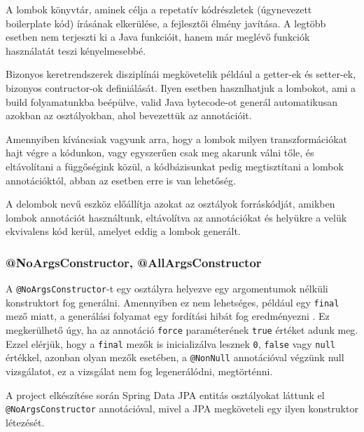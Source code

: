 A lombok könyvtár, aminek célja a repetatív kódrészletek (úgynevezett boilerplate kód) írásának elkerülése, a fejlesztői élmény javítása. A legtöbb esetben nem terjeszti ki a Java funkcióit, hanem már meglévő funkciók használatát teszi kényelmesebbé. \par

Bizonyos keretrendszerek disziplínái megkövetelik például a getter-ek és setter-ek, bizonyos contructor-ok definiálását. Ilyen esetben hasznlhatjuk a lombokot, ami a build folyamatunkba beépülve, valid Java bytecode-ot generál automatikusan azokban az osztályokban, ahol bevezettük az annotációit.\par

Amennyiben kíváncsiak vagyunk arra, hogy a lombok milyen transzformációkat hajt végre a kódunkon, vagy egyszerűen csak meg akarunk válni tőle, és eltávolítani a függőségink közül, a kódbázisunkat pedig megtisztítani a lombok annotációktól, abban az esetben erre is van lehetőség. \par

A delombok nevű eszköz előállítja azokat az osztályok forráskódját, amikben lombok annotációt használtunk, eltávolítva az annotációkat és helyükre a velük ekvivalens kód kerül, amelyet eddig a lombok generált. \par


\subsubsection{@NoArgsConstructor, @AllArgsConstructor}

A \lstinline|@NoArgsConstructor|-t egy osztályra helyezve egy argomentumok nélküli konstruktort fog generálni. Amennyiben ez nem lehetséges, például egy \lstinline|final| mező miatt, a generálási folyamat egy fordítási hibát fog eredményezni \cite{lombokConstructorDocumentation}. Ez megkerülhető úgy, ha az annotáció \lstinline|force| paraméterének \lstinline|true| értéket adunk meg. Ezzel elérjük, hogy a \lstinline|final| mezők is inicializálva lesznek \lstinline|0|, \lstinline|false| vagy \lstinline|null| értékkel, azonban olyan mezők esetében, a \lstinline|@NonNull| annotációval végzünk null vizsgálatot, ez a vizsgálat nem fog legenerálódni, megtörténni. \par


A project elkészítése során Spring Data JPA entitás osztályokat láttunk el \lstinline|@NoArgsConstructor| annotációval, mivel a JPA megköveteli egy ilyen konstruktor létezését. \par


